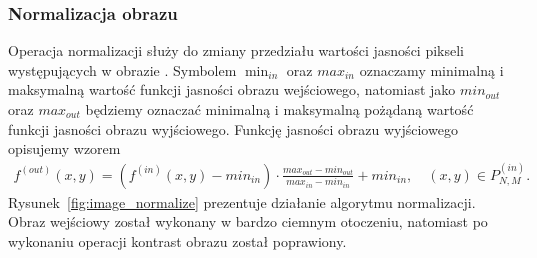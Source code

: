 \subsubsection{Normalizacja obrazu}
Operacja normalizacji służy do zmiany przedziału wartości jasności pikseli występujących w obrazie \cite{gonzalez02}. Symbolem $\min_{in}$ oraz $max_{in}$ oznaczamy minimalną i maksymalną wartość funkcji jasności obrazu wejściowego, natomiast jako $min_{out}$ oraz $max_{out}$ będziemy oznaczać minimalną i maksymalną pożądaną wartość funkcji jasności obrazu wyjściowego. Funkcję jasności obrazu wyjściowego opisujemy wzorem
\begin{gather*}
  f^{(out)}(x, y) = (f^{(in)}(x, y) - min_{in}) \cdot \frac{max_{out} - min_{out}}{max_{in} - min_{in}}+min_{in}, \quad  (x, y) \in P^{(in)}_{N,M}.
\end{gather*}
Rysunek~\ref{fig:image_normalize} prezentuje działanie algorytmu normalizacji. Obraz wejściowy został wykonany w bardzo ciemnym otoczeniu, natomiast po wykonaniu operacji kontrast obrazu został poprawiony.
